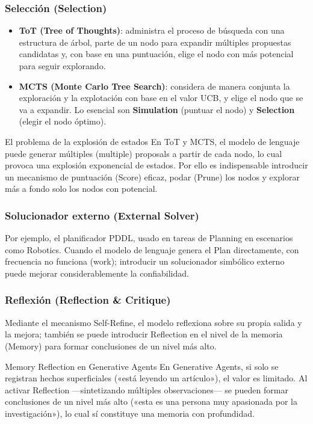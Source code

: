 \documentclass[a4paper]{article}
\begin{document}
\subsubsection{Selección (Selection)}

\begin{itemize}
    \item \textbf{ToT (Tree of Thoughts)}: administra el proceso de búsqueda con una estructura de árbol, parte de un nodo para expandir múltiples propuestas candidatas y, con base en una puntuación, elige el nodo con más potencial para seguir explorando.
    \item \textbf{MCTS (Monte Carlo Tree Search)}: considera de manera conjunta la exploración y la explotación con base en el valor UCB, y elige el nodo que se va a expandir. Lo esencial son \textbf{Simulation} (puntuar el nodo) y \textbf{Selection} (elegir el nodo óptimo).
\end{itemize}

\begin{warningbox}{El problema de la explosión de estados}
En ToT y MCTS, el modelo de lenguaje puede generar múltiples (multiple) proposals a partir de cada nodo, lo cual provoca una explosión exponencial de estados. Por ello es indispensable introducir un mecanismo de puntuación (Score) eficaz, podar (Prune) los nodos y explorar más a fondo solo los nodos con potencial.
\end{warningbox}

\subsubsection{Solucionador externo (External Solver)}

Por ejemplo, el planificador PDDL, usado en tareas de Planning en escenarios como Robotics. Cuando el modelo de lenguaje genera el Plan directamente, con frecuencia no funciona (work); introducir un solucionador simbólico externo puede mejorar considerablemente la confiabilidad.

\subsubsection{Reflexión (Reflection \& Critique)}

Mediante el mecanismo Self-Refine, el modelo reflexiona sobre su propia salida y la mejora; también se puede introducir Reflection en el nivel de la memoria (Memory) para formar conclusiones de un nivel más alto.

\begin{knowledgebox}{Memory Reflection en Generative Agents}
En Generative Agents, si solo se registran hechos superficiales («está leyendo un artículo»), el valor es limitado. Al activar Reflection —sintetizando múltiples observaciones— se pueden formar conclusiones de un nivel más alto («esta es una persona muy apasionada por la investigación»), lo cual sí constituye una memoria con profundidad.
\end{knowledgebox}
\end{document}
